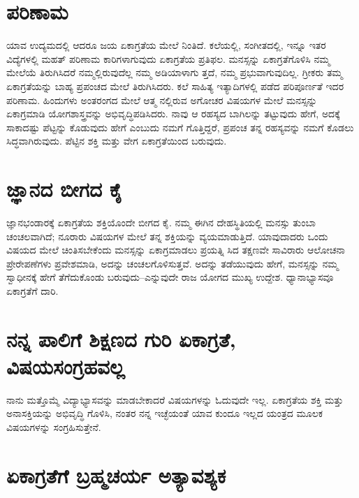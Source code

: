 \section{ಪರಿಣಾಮ}

ಯಾವ ಉದ್ಯಮದಲ್ಲಿ ಆದರೂ ಜಯ ಏಕಾಗ್ರತೆಯ ಮೇಲೆ ನಿಂತಿದೆ. ಕಲೆಯಲ್ಲಿ, ಸಂಗೀತದಲ್ಲಿ, ಇನ್ನೂ ಇತರ ವಿದ್ಯೆಗಳಲ್ಲಿ ಮಹತ್ ಪರಿಣಾಮ ಕಾರಿಗಳಾಗುವುದು ಏಕಾಗ್ರತೆಯ ಪ್ರತಿಫಲ. ಮನಸ್ಸನ್ನು ಏಕಾಗ್ರತೆಗೊಳಿಸಿ ನಮ್ಮ ಮೇಲೆಯೆ ತಿರುಗಿಸಿದರೆ ನಮ್ಮಲ್ಲಿರುವುದೆಲ್ಲ ನಮ್ಮ ಅಡಿಯಾಳಾಗು ತ್ತದೆ, ನಮ್ಮ ಪ್ರಭುವಾಗುವುದಿಲ್ಲ. ಗ್ರೀಕರು ತಮ್ಮ ಏಕಾಗ್ರತೆಯನ್ನು ಬಾಹ್ಯ ಪ್ರಪಂಚದ ಮೇಲೆ ತಿರುಗಿಸಿದರು. ಕಲೆ ಸಾಹಿತ್ಯ ಇತ್ಯಾದಿಗಳಲ್ಲಿ ಪಡೆದ ಪರಿಪೂರ್ಣತೆ ಇದರ ಪರಿಣಾಮ. ಹಿಂದುಗಳು ಅಂತರಂಗದ ಮೇಲೆ ಆತ್ಮ ನಲ್ಲಿರುವ ಅಗೋಚರ ವಿಷಯಗಳ ಮೇಲೆ ಮನಸ್ಸನ್ನು ಏಕಾಗ್ರಮಾಡಿ ಯೋಗಶಾಸ್ತ್ರವನ್ನು ಅಭಿವೃದ್ಧಿಪಡಿಸಿದರು. ನಾವು ಆ ರಹಸ್ಯದ ಬಾಗಿಲನ್ನು ತಟ್ಟುವುದು ಹೇಗೆ, ಅದಕ್ಕೆ ಸಾಕಾದಷ್ಟು ಪೆಟ್ಟನ್ನು ಕೊಡುವುದು ಹೇಗೆ ಎಂಬುದು ನಮಗೆ ಗೊತ್ತಿದ್ದರೆ, ಪ್ರಪಂಚ ತನ್ನ ರಹಸ್ಯವನ್ನು ನಮಗೆ ಕೊಡಲು ಸಿದ್ಧವಾಗಿರುವುದು. ಪೆಟ್ಟಿನ ಶಕ್ತಿ ಮತ್ತು ವೇಗ ಏಕಾಗ್ರತೆಯಿಂದ ಬರುವುದು.


\section{ಜ್ಞಾನದ ಬೀಗದ ಕೈ}

ಜ್ಞಾನಭಂಡಾರಕ್ಕೆ ಏಕಾಗ್ರತೆಯ ಶಕ್ತಿಯೊಂದೇ ಬೀಗದ ಕೈ. ನಮ್ಮ ಈಗಿನ ದೇಹಸ್ಥಿತಿಯಲ್ಲಿ ಮನಸ್ಸು ತುಂಬಾ ಚಂಚಲವಾಗಿದೆ; ನೂರಾರು ವಿಷಯಗಳ ಮೇಲೆ ತನ್ನ ಶಕ್ತಿಯನ್ನು ವ್ಯಯಮಾಡುತ್ತಿದೆ. ಯಾವುದಾದರು ಒಂದು ವಿಷಯದ ಮೇಲೆ ಚಿಂತಿಸಬೇಕೆಂದು ಮನಸ್ಸನ್ನು ಏಕಾಗ್ರಮಾಡಲು ಪ್ರಯತ್ನಿ ಸಿದ ತಕ್ಷಣವೇ ಸಾವಿರಾರು ಆಲೋಚನಾ ಪ್ರೇರೇಪಣೆಗಳು ಪ್ರವೇಶಮಾಡಿ, ಅದನ್ನು ಚಂಚಲಗೊಳಿಸುತ್ತವೆ. ಅದನ್ನು ತಡೆಯುವುದು ಹೇಗೆ, ಮನಸ್ಸನ್ನು ನಮ್ಮ ಸ್ವಾಧೀನಕ್ಕೆ ಹೇಗೆ ತೆಗೆದುಕೊಂಡು ಬರುವುದು–ಎನ್ನುವುದೇ ರಾಜ ಯೋಗದ ಮುಖ್ಯ ಉದ್ದೇಶ. ಧ್ಯಾನಾಭ್ಯಾಸವೂ ಏಕಾಗ್ರತೆಗೆ ದಾರಿ.


\section{ನನ್ನ ಪಾಲಿಗೆ ಶಿಕ್ಷಣದ ಗುರಿ ಏಕಾಗ್ರತೆ, ವಿಷಯಸಂಗ್ರಹವಲ್ಲ}

ನಾನು ಮತ್ತೊಮ್ಮೆ ವಿದ್ಯಾಭ್ಯಾಸವನ್ನು ಮಾಡಬೇಕಾದರೆ ವಿಷಯಗಳನ್ನು ಓದುವುದೇ ಇಲ್ಲ. ಏಕಾಗ್ರತೆಯ ಶಕ್ತಿ ಮತ್ತು ಅನಾಸಕ್ತಿಯನ್ನು ಅಭಿವೃದ್ಧಿ ಗೊಳಿಸಿ, ನಂತರ ನನ್ನ ಇಚ್ಛೆಯಂತೆ ಯಾವ ಕುಂದೂ ಇಲ್ಲದ ಯಂತ್ರದ ಮೂಲಕ ವಿಷಯಗಳನ್ನು ಸಂಗ್ರಹಿಸುತ್ತೇನೆ.


\section{ಏಕಾಗ್ರತೆಗೆ ಬ್ರಹ್ಮಚರ್ಯ ಅತ್ಯಾವಶ್ಯಕ}


